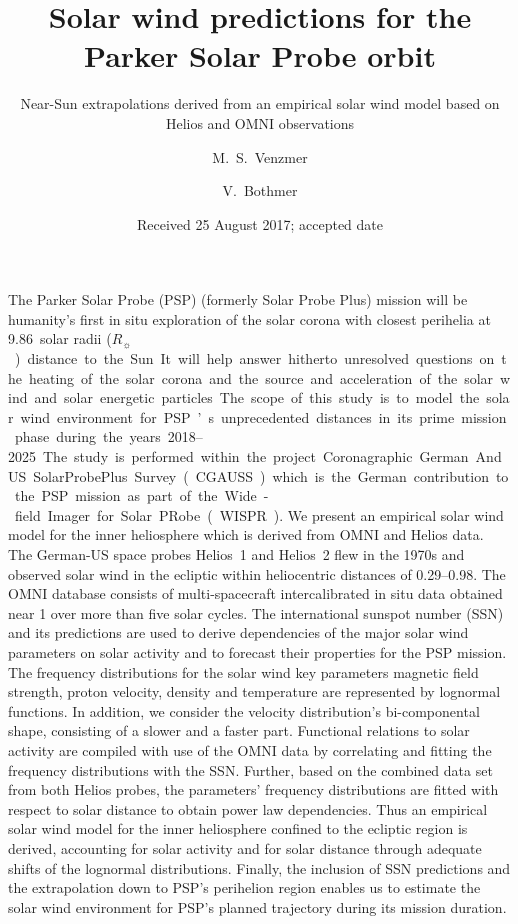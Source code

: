 \documentclass[]{aa}
\newcommand{\Rs}{$R_\sun{}$}
\begin{document}
	\title{Solar wind predictions for the Parker Solar Probe orbit}
	\subtitle{Near-Sun extrapolations derived from an empirical solar wind model based on Helios and OMNI observations}
	\author{M.~S.~Venzmer
	\and V.~Bothmer}
	\date{Received 25 August 2017; accepted date}

	\abstract
	{The Parker Solar Probe (PSP) (formerly Solar Probe Plus) mission will be humanity’s first in situ exploration of the solar corona with closest perihelia at \num{9.86}~solar radii (\si{\Rs}) distance to the Sun. It will help answer hitherto unresolved questions on the heating of the solar corona and the source and acceleration of the solar wind and solar energetic particles. The scope of this study is to model the solar wind environment for PSP’s unprecedented distances in its prime mission phase during the years \numrange{2018}{2025}. The study is performed within the project Coronagraphic German And US SolarProbePlus Survey (CGAUSS) which is the German contribution to the PSP mission as part of the Wide-field Imager for Solar PRobe (WISPR).}
	{We present an empirical solar wind model for the inner heliosphere which is derived from OMNI and Helios data. The German-US space probes Helios~1 and Helios~2 flew in the 1970s and observed solar wind in the ecliptic within heliocentric distances of \SIrange{0.29}{0.98}{\au}. The OMNI database consists of multi-spacecraft intercalibrated in situ data obtained near \SI{1}{\au} over more than five solar cycles. The international sunspot number (SSN) and its predictions are used to derive dependencies of the major solar wind parameters on solar activity and to forecast their properties for the PSP mission.}
	{The frequency distributions for the solar wind key parameters magnetic field strength, proton velocity, density and temperature are represented by lognormal functions. In addition, we consider the velocity distribution’s bi-componental shape, consisting of a slower and a faster part. Functional relations to solar activity are compiled with use of the OMNI data by correlating and fitting the frequency distributions with the SSN. Further, based on the combined data set from both Helios probes, the parameters’ frequency distributions are fitted with respect to solar distance to obtain power law dependencies. Thus an empirical solar wind model for the inner heliosphere confined to the ecliptic region is derived, accounting for solar activity and for solar distance through adequate shifts of the lognormal distributions. Finally, the inclusion of SSN predictions and the extrapolation down to PSP’s perihelion region enables us to estimate the solar wind environment for PSP’s planned trajectory during its mission duration.}
\end{document}
